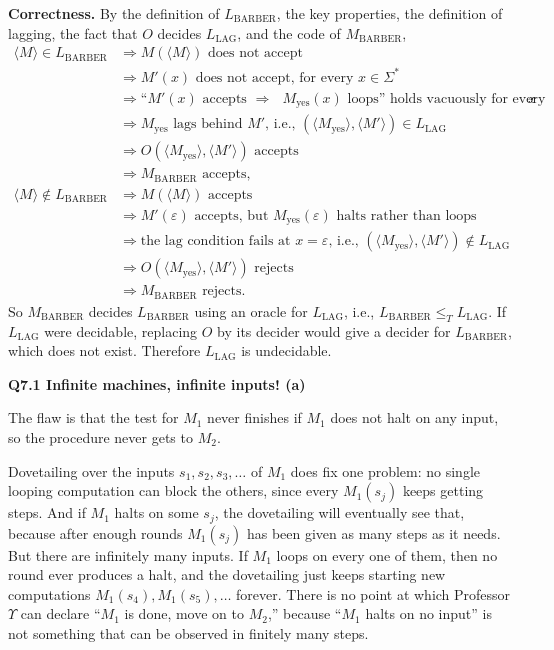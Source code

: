 \documentclass[11pt]{article}
\newcommand{\inner}[1]{\langle #1 \rangle}
\newcommand{\lT}{\leq_T}
\newcommand{\Lb}{L_{\text{BARBER}}}
\newcommand{\Llag}{L_{\text{LAG}}}
\newcommand{\Mb}{M_{\text{BARBER}}}
\newcommand{\qpage}[1]{\clearpage\noindent\textbf{\large #1}\par\medskip}
\begin{document}
\textbf{Correctness.}
By the definition of $\Lb$, the key properties, the definition of lagging, the fact that $O$ decides $\Llag$, and the code of $\Mb$,
\begin{align*}
  \inner{M} \in \Lb &\Longrightarrow M(\inner{M}) \text{ does not accept} \\
  &\Longrightarrow M'(x) \text{ does not accept, for every } x \in \Sigma^* \\
  &\Longrightarrow \text{``$M'(x)$ accepts $\Rightarrow$ $M_{\text{yes}}(x)$ loops'' holds vacuously for every } x \\
  &\Longrightarrow M_{\text{yes}} \text{ lags behind } M'\text{, i.e., } (\inner{M_{\text{yes}}}, \inner{M'}) \in \Llag \\
  &\Longrightarrow O(\inner{M_{\text{yes}}}, \inner{M'}) \text{ accepts} \\
  &\Longrightarrow \Mb \text{ accepts}, \\[0.5em]
  \inner{M} \notin \Lb &\Longrightarrow M(\inner{M}) \text{ accepts} \\
  &\Longrightarrow M'(\varepsilon) \text{ accepts, but } M_{\text{yes}}(\varepsilon) \text{ halts rather than loops} \\
  &\Longrightarrow \text{the lag condition fails at } x = \varepsilon\text{, i.e., } (\inner{M_{\text{yes}}}, \inner{M'}) \notin \Llag \\
  &\Longrightarrow O(\inner{M_{\text{yes}}}, \inner{M'}) \text{ rejects} \\
  &\Longrightarrow \Mb \text{ rejects}.
\end{align*}
So $\Mb$ decides $\Lb$ using an oracle for $\Llag$, i.e., $\Lb \lT \Llag$.
If $\Llag$ were decidable, replacing $O$ by its decider would give a decider for $\Lb$, which does not exist.
Therefore $\Llag$ is undecidable.

\qpage{Q7.1 Infinite machines, infinite inputs! (a)}

The flaw is that the test for $M_1$ never finishes if $M_1$ does not halt on any input, so the procedure never gets to $M_2$.

Dovetailing over the inputs $s_1, s_2, s_3, \ldots$ of $M_1$ does fix one problem: no single looping computation can block the others, since every $M_1(s_j)$ keeps getting steps.
And if $M_1$ halts on some $s_j$, the dovetailing will eventually see that, because after enough rounds $M_1(s_j)$ has been given as many steps as it needs.
But there are infinitely many inputs.
If $M_1$ loops on every one of them, then no round ever produces a halt, and the dovetailing just keeps starting new computations $M_1(s_4), M_1(s_5), \ldots$ forever.
There is no point at which Professor $\Upsilon$ can declare ``$M_1$ is done, move on to $M_2$,'' because ``$M_1$ halts on no input'' is not something that can be observed in finitely many steps.
\end{document}
